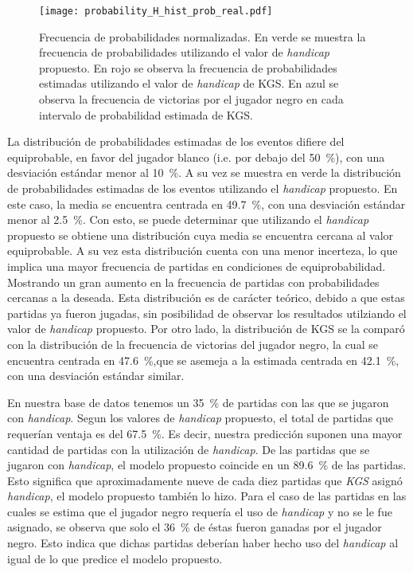 \documentclass[11pt,twoside,spanish]{report} %
\begin{document}
\begin{figure}[H]
	\centering
	\texttt{[image: probability\_H\_hist\_prob\_real.pdf]}
	\caption{Frecuencia de probabilidades normalizadas. En verde se muestra la frecuencia de probabilidades utilizando el valor de \textit{handicap} propuesto. En rojo se observa la frecuencia de probabilidades estimadas utilizando el valor de \textit{handicap} de KGS.  En azul se observa la frecuencia de victorias por el jugador negro en cada intervalo de probabilidad estimada de KGS.}
	\label{fig:estimations_H_hist_prob_real}
\end{figure}

La distribuci\'on de probabilidades estimadas de los eventos difiere del equiprobable, en favor del jugador blanco (i.e. por debajo del \SI{50}{\percent}), con una desviaci\'on est\'andar menor al \SI{10}{\percent}.
A su vez se muestra en verde la distribuci\'on de probabilidades estimadas de los eventos utilizando el \textit{handicap} propuesto.
En este caso, la media se encuentra centrada en \SI{49.7}{\percent}, con una desviaci\'on est\'andar menor al \SI{2.5}{\percent}.
Con esto, se puede determinar que utilizando el \textit{handicap} propuesto se obtiene una distribuci\'on cuya media se encuentra cercana al valor equiprobable.
A su vez esta distribuci\'on cuenta con una menor incerteza, lo que implica una mayor frecuencia de partidas en condiciones de equiprobabilidad.
Mostrando un gran aumento en la frecuencia de partidas con probabilidades cercanas a la deseada.
Esta distribuci\'on es de car\'acter te\'orico, debido a que estas partidas ya fueron jugadas, sin posibilidad de observar los resultados utilziando el valor de \textit{handicap} propuesto.
Por otro lado, la distribuci\'on de KGS se la compar\'o con la distribuci\'on de la frecuencia de victorias del jugador negro, la cual se encuentra centrada en \SI{47.6}{\percent},que se asemeja a la estimada centrada en  \SI{42.1}{\percent}, con una desviaci\'on est\'andar similar.



En nuestra base de datos tenemos un \SI{35}{\percent} de partidas con las que se jugaron con \textit{handicap}.
Segun los valores de \textit{handicap} propuesto, el total de partidas que requer\'ian ventaja es del \SI{67.5}{\percent}.
Es decir, nuestra predicci\'on suponen una mayor cantidad de partidas con la utilizaci\'on de \textit{handicap}.
De las partidas que se jugaron con \textit{handicap}, el modelo propuesto coincide en un \SI{89.6}{\percent} de las partidas.
Esto significa que aproximadamente nueve de cada diez partidas que \textit{KGS} asign\'o \textit{handicap}, el modelo propuesto tambi\'en lo hizo.
Para el caso de las partidas en las cuales se estima que el jugador negro  requer\'ia el uso de \textit{handicap} y no se le fue asignado, se observa que solo el \SI{36}{\percent} de \'estas fueron ganadas por el jugador negro.
Esto indica que dichas partidas deber\'ian haber hecho uso del \textit{handicap} al igual de lo que predice el modelo propuesto.
\end{document}
